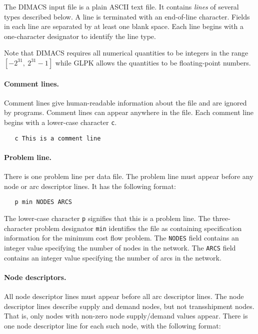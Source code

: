 \documentclass[dvipdfm,11pt]{report}
\begin{document}
The DIMACS input file is a plain ASCII text file. It contains
{\it lines} of several types described below. A line is terminated with
an end-of-line character. Fields in each line are separated by at least
one blank space. Each line begins with a one-character designator to
identify the line type.

Note that DIMACS requires all numerical quantities to be integers in
the range $[-2^{31},\ 2^{31}-1]$ while GLPK allows the quantities to be
floating-point numbers.

\newpage

\paragraph{Comment lines.} Comment lines give human-readable information
about the file and are ignored by programs. Comment lines can appear
anywhere in the file. Each comment line begins with a lower-case
character \verb|c|.

\begin{verbatim}
   c This is a comment line
\end{verbatim}

\paragraph{Problem line.} There is one problem line per data file. The
problem line must appear before any node or arc descriptor lines. It has
the following format:

\begin{verbatim}
   p min NODES ARCS
\end{verbatim}

\noindent
The lower-case character \verb|p| signifies that this is a problem line.
The three-character problem designator \verb|min| identifies the file as
containing specification information for the minimum cost flow problem.
The \verb|NODES| field contains an integer value specifying the number
of nodes in the network. The \verb|ARCS| field contains an integer value
specifying the number of arcs in the network.

\paragraph{Node descriptors.} All node descriptor lines must appear
before all arc descriptor lines. The node descriptor lines describe
supply and demand nodes, but not transshipment nodes. That is, only
nodes with non-zero node supply/demand values appear. There is one node
descriptor line for each such node, with the following format:
\end{document}
